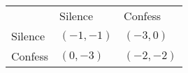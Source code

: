 \begin{center}
    \begin{tabular}{lll}
                                 & Silence     & Confess                         \\ \cline{2-3}
    \multicolumn{1}{l|}{Silence}   & $(-1, -1)$  & \multicolumn{1}{l|}{$(-3, 0)$}  \\
    \multicolumn{1}{l|}{Confess}   & $(0, -3)$  & \multicolumn{1}{l|}{$(-2, -2)$}  \\ \cline{2-3}
    \end{tabular}
\end{center}